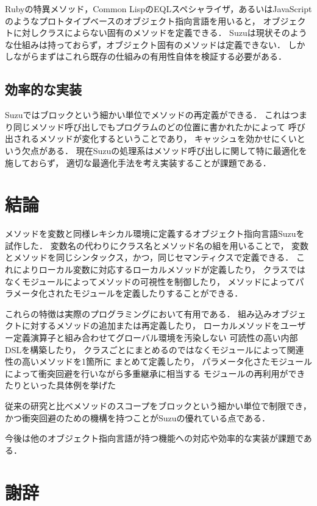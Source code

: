 \documentclass[a4paper,11pt,dvipdfmx]{jreport}
\begin{document}
Rubyの特異メソッド，Common LispのEQLスペシャライザ，あるいはJavaScript
のようなプロトタイプベースのオブジェクト指向言語を用いると，
オブジェクトに対しクラスによらない固有のメソッドを定義できる．
Suzuは現状そのような仕組みは持っておらず，オブジェクト固有のメソッドは定義できない．
しかしながらまずはこれら既存の仕組みの有用性自体を検証する必要がある．

\section{効率的な実装}

Suzuではブロックという細かい単位でメソッドの再定義ができる．
これはつまり同じメソッド呼び出しでもプログラムのどの位置に書かれたかによって
呼び出されるメソッドが変化するということであり，
キャッシュを効かせにくいという欠点がある．
現在Suzuの処理系はメソッド呼び出しに関して特に最適化を施しておらず，
適切な最適化手法を考え実装することが課題である．


\chapter{結論}
\label{chapter:conclusion}

メソッドを変数と同様レキシカル環境に定義するオブジェクト指向言語Suzuを試作した．
変数名の代わりにクラス名とメソッド名の組を用いることで，
変数とメソッドを同じシンタックス，かつ，同じセマンティクスで定義できる．
これによりローカル変数に対応するローカルメソッドが定義したり，
クラスではなくモジュールによってメソッドの可視性を制御したり，
メソッドによってパラメータ化されたモジュールを定義したりすることができる．

これらの特徴は実際のプログラミングにおいて有用である．
組み込みオブジェクトに対するメソッドの追加または再定義したり，
ローカルメソッドをユーザー定義演算子と組み合わせてグローバル環境を汚染しない
可読性の高い内部DSLを構築したり，
クラスごとにまとめるのではなくモジュールによって関連性の高いメソッドを1箇所に
まとめて定義したり，
パラメータ化さたモジュールによって衝突回避を行いながら多重継承に相当する
モジュールの再利用ができたりといった具体例を挙げた

従来の研究と比べメソッドのスコープをブロックという細かい単位で制限でき，
かつ衝突回避のための機構を持つことがSuzuの優れている点である．

今後は他のオブジェクト指向言語が持つ機能への対応や効率的な実装が課題である．


\chapter*{謝辞}
\end{document}
